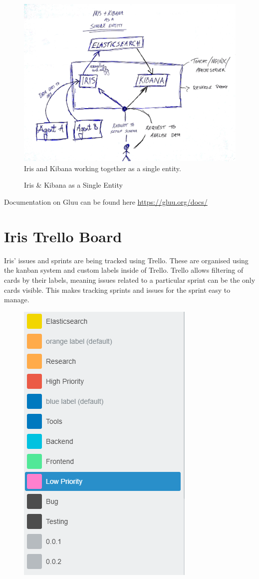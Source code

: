 \documentclass[12pt,a4paper,titlepage]{report}
\begin{document}
\begin{appendices}
\begin{figure}[H]
\begin{tcolorbox}
\includegraphics[width=\textwidth,height=\textheight,keepaspectratio]{iris_kibana_single_entity}
\newline
Iris and Kibana working together as a single entity.
\end{tcolorbox}
\caption{Iris \& Kibana as a Single Entity}
\end{figure}
Documentation on Gluu can be found here \url{https://gluu.org/docs/}

\chapter{Iris Trello Board}\label{sec:trello}

Iris’ issues and sprints are being tracked using Trello. These are organised using the kanban system and custom labels inside of Trello. Trello allows filtering of cards by their labels, meaning issues related to a particular sprint can be the only cards visible. This makes tracking sprints and issues for the sprint easy to manage.

\begin{figure}[H]\centering
\begin{tcolorbox}[text width=.8\textwidth]
\centerline{\includegraphics[width=.4\textwidth]{trello_labels}}


\end{tcolorbox}
\end{figure}
\end{appendices}
\end{document}
